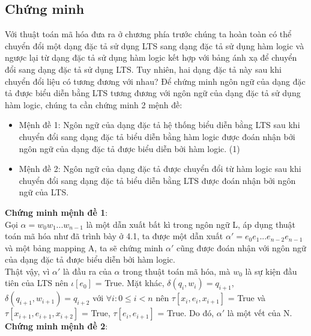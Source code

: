 \documentclass[a4paper,13pt,oneside,openany]{book}
\begin{document}
\begin{flushleft}
		\section{Chứng minh}
		Với thuật toán mã hóa đưa ra ở chương phía trước chúng ta hoàn toàn có thể chuyển đổi một dạng đặc tả sử dụng LTS sang dạng đặc tả sử dụng hàm logic và ngược lại từ dạng đặc tả sử dụng hàm logic kết hợp với bảng ánh xạ để chuyển đổi sang dạng đặc tả sử dụng LTS. Tuy nhiên, hai dạng đặc tả này sau khi chuyển đổi liệu có tương đương với nhau?
		Để chứng minh ngôn ngữ của dạng đặc tả được biểu diễn bằng LTS tương đương với ngôn ngữ của dạng đặc tả sử dụng hàm logic, chúng ta cần chứng minh 2 mệnh đề:
		\begin{itemize}
			\item Mệnh đề 1: Ngôn ngữ của dạng đặc tả hệ thống biểu diễn bằng LTS sau khi chuyển đổi sang dạng đặc tả biểu diễn bằng hàm logic được đoán nhận bởi ngôn ngữ của dạng đặc tả được biểu diễn bởi hàm logic. (1)\\
			\item Mệnh đề 2: Ngôn ngữ của dạng đặc tả được chuyển đổi từ hàm logic sau khi chuyển đổi sang dạng đặc tả biểu diễn bằng LTS được đoán nhận bởi ngôn ngữ của LTS.
		\end{itemize}
		\textbf{Chứng minh mệnh đề 1}:\\
		Gọi $\alpha = w_0w_1...w_{n-1}$ là một dẫn xuất bất kì trong ngôn ngữ L, áp dụng thuật toán mã hóa như đã trình bày ở 4.1, ta được một dẫn xuất $\alpha' = e_0e_1...e_{n-2}e_{n-1}$ và một bảng mapping A, ta sẽ chứng minh $\alpha'$ cũng được đoán nhận với ngôn ngữ của dạng đặc tả được biểu diễn bởi hàm logic.\\
		Thật vậy, vì $\alpha'$ là đầu ra của $\alpha$ trong thuật toán mã hóa, mà $w_{0}$ là sự kiện đầu tiên của LTS nên $\iota[e_0]$ = True. Mặt khác, $\delta(q_i, w_i) = q_{i+1}$, $\delta(q_{i+1}, w_{i+1}) = q_{i+2}$ với $\forall i: 0 \leq i < n$ nên $\tau[x_i, e_i, x_{i+1}]$ = True và $\tau[x_{i+1}, e_{i+1}, x_{i+2}]$ = True, $\tau[e_i, e_{i+1}]$ = True. Do đó, $\alpha'$ là một vết của N.\\
		\textbf{Chứng minh mệnh đề 2}:\\

\end{flushleft}
\end{document}
